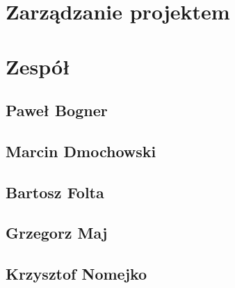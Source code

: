 \documentclass[11pt, a4paper]{article}
\begin{document}
	

	\section{Zarządzanie projektem}
		


%








	\section{Zespół}
		\subsection{Paweł Bogner}
			
		\subsection{Marcin Dmochowski}
			
		\subsection{Bartosz Folta}
			
		\subsection{Grzegorz Maj}
			
		\subsection{Krzysztof Nomejko}
			
\end{document}

